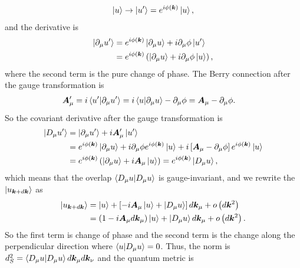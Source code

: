 \documentclass[12pt, oneside]{article}
\newcommand{\pr}{\prime}
\newcommand{\pa}{\partial}
\newcommand{\p}[1]{\left(#1\right)}
\newcommand{\bb}[1]{\left[#1\right]}
\numberwithin{equation}{subsection}
\begin{document}
\begin{align}
	\ket{u} \rightarrow \ket{u^\pr} = e^{i \phi \p{\bm{k}}} \ket{u},
\end{align}
and the derivative is
\begin{align}
	\begin{split}
		\ket{\pa_\mu u^\pr} & = e^{i \phi \p{\bm{k}}} \ket{\pa_\mu u} + i \pa_{\mu} \phi \ket{u^\pr} \\
		& = e^{i \phi \p{\bm{k}}}\p{\ket{\pa_\mu u} + i \pa_{\mu} \phi \ket{u}},\\
	\end{split}
\end{align}
where the second term is the pure change of phase. The Berry connection after the gauge transformation is
\begin{align}
	\begin{split}
		\bm{A}^\pr_\mu & = i \braket{u^\pr | \pa_\mu u^\pr} = i \braket{u | \pa_\mu u} - \pa_\mu \phi = \bm{A}_\mu - \pa_\mu \phi.
	\end{split}
\end{align}
So the covariant derivative after the gauge transformation is
\begin{align}
	\begin{split}
		\ket{D_\mu u^\pr} & = \ket{\pa_\mu u^\pr} + i \bm{A}^\pr_\mu \ket{u^\pr} \\
		& = e^{i \phi \p{\bm{k}}} \ket{\pa_\mu u} + i \pa_{\mu} \phi e^{i \phi \p{\bm{k}}} \ket{u} + i \bb{\bm{A}_\mu - \pa_\mu \phi} e^{i \phi \p{\bm{k}}} \ket{u} \\
		& = e^{i \phi \p{\bm{k}}} \p{\ket{\pa_\mu u} + i \bm{A}_\mu \ket{u}} = e^{i \phi\p{\bm{k}}} \ket{D_\mu u},
	\end{split}
\end{align}
which means that the overlap \(\braket{D_\mu u | D_\mu u}\) is gauge-invariant, and we rewrite the \(\ket{u_{\bm{k} + d \bm{k}}}\) as
\begin{align}
	\begin{split}
		\ket{u_{\bm{k} + d \bm{k}}} & = \ket{u} + \bb{-i \bm{A}_\mu \ket{u} + \ket{D_{\mu} u}} d\bm{k}_\mu + o\p{d \bm{k}^2} \\
		& = \p{1 - i \bm{A}_\mu d \bm{k}_\mu} \ket{u} + \ket{D_\mu u} d \bm{k}_\mu + o\p{d \bm{k}^2}.
	\end{split}
\end{align}
So the first term is change of phase and the second term is the change along the perpendicular direction where \(\braket{u|D_\mu u} = 0\). Thus, the norm is \(d^2_{S} = \braket{D_\mu u | D_\mu u} d \bm{k}_\mu d \bm{k}_{\nu}\) and the quantum metric is 
\end{document}
